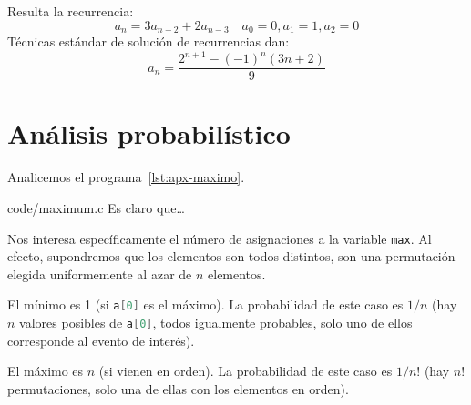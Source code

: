   Resulta la recurrencia:
  \begin{equation*}
    a_n
      = 3 a_{n - 2} + 2 a_{n - 3}
      \quad a_0 = 0, a_1 = 1, a_2 = 0
  \end{equation*}
  Técnicas estándar de solución de recurrencias dan:
  \begin{equation*}
    a_n
      = \frac{2^{n + 1} - (-1)^n (3 n + 2)}{9}
  \end{equation*}

\section{Análisis probabilístico}
\label{sec:analisis-probabilistico}

  Analicemos el programa~\ref{lst:apx-maximo}.
  
                   {code/maximum.c}
  Es claro que\ldots{}

  Nos interesa específicamente el número de asignaciones
  a la variable \lstinline[language = C]!max!.
  Al efecto,
  supondremos que los elementos son todos distintos,
  son una permutación elegida uniformemente al azar de \(n\) elementos.

  El mínimo es \num{1}
  (si \lstinline[language = C]!a[0]! es el máximo).
  La probabilidad de este caso es \(1/n\)
  (hay \(n\) valores posibles de \lstinline[language = C]!a[0]!,
   todos igualmente probables,
   solo uno de ellos corresponde al evento de interés).

  El máximo es \(n\)
  (si vienen en orden).
  La probabilidad de este caso es \(1/n!\)
  (hay \(n!\) permutaciones,
   solo una de ellas con los elementos en orden).

